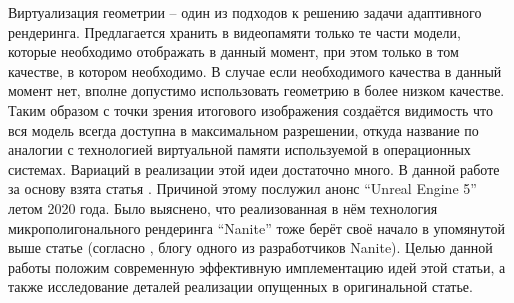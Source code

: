 Виртуализация геометрии -- один из подходов к решению задачи адаптивного рендеринга. Предлагается хранить в видеопамяти только те части модели, которые необходимо отображать в данный момент, при этом только в том качестве, в котором необходимо. В случае если необходимого качества в данный момент нет, вполне допустимо использовать геометрию в более низком качестве. Таким образом с точки зрения итогового изображения создаётся видимость что вся модель всегда доступна в максимальном разрешении, откуда название по аналогии с технологией виртуальной памяти используемой в операционных системах. Вариаций в реализации этой идеи достаточно много. В данной работе за основу взята статья \cite{niski2007multi}. Причиной этому послужил анонс ``Unreal Engine 5'' \cite{ue5} летом 2020 года. Было выяснено, что реализованная в нём технология микрополигонального рендеринга ``Nanite'' тоже берёт своё начало в упомянутой выше статье (согласно \cite{graphicrants_vgi}, блогу одного из разработчиков Nanite). Целью данной работы положим современную эффективную имплементацию идей этой статьи, а также исследование деталей реализации опущенных в оригинальной статье.


